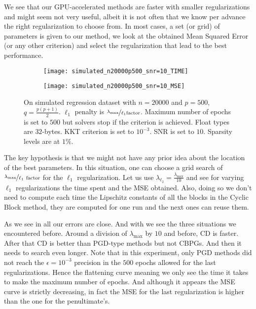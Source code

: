 \documentclass[../main.tex]{subfiles}
\begin{document}
\medskip

We see that our GPU-accelerated methods are faster with smaller regularizations
and might seem not very useful, albeit it is not often that we know per advance
the right regularization to choose from.
In most cases, a set (or grid) of parameters is given to our method, we look at
the obtained Mean Squared Error (or any other criterion) and select the
regularization that lead to the best performance.
\begin{figure}[h!]
	\begin{subfigure}{.47\textwidth}
		\centering
		\texttt{[image: simulated\_n20000p500\_snr=10\_TIME]}
		\label{fig:time_search}
	\end{subfigure} \hfill
	\begin{subfigure}{.47\textwidth}
		\centering
		\texttt{[image: simulated\_n20000p500\_snr=10\_MSE]}
		\label{fig:mse_search}
	\end{subfigure}
	\caption{On simulated regression dataset with $n=20000$ and $p=500$, $q=\frac{p(p+1)}{2}$.
	$\ell_1$ penalty is $\nicefrac{\lambda_{\max}}{\ell_1\text{factor}}$.
	Maximum number of epochs is set to $500$ but solvers stop if the criterion is achieved.
	Float types are $32$-bytes.
	KKT criterion is set to $10^{-3}$. SNR is set to $10$.
	Sparsity levels are at $1\%$.}
	\label{fig:path_simu}
\end{figure}
The key hypothesis is that we might not have any prior idea about the location
of the best parameters. In this situation, one can choose a grid search of
$\nicefrac{\lambda_{\max}}{\ell_1\ \text{factor}}$ for the $\ell_1$ regularization.
Let us use $\lambda_{\ell_2}=\frac{\lambda_{\max}}{10}$ and see for varying
$\ell_1$ regularizations the time spent and the MSE obtained.
Also, doing so we don't need to compute each time the Lipschitz constants of
all the blocks in the Cyclic Block method, they are computed for one run and
the next ones can reuse them.

\medskip

As we see in  all our errors are close.
And with  we see the three situations we encountered before.
Around a division of $\lambda_{\max}$ by $10$ and before, CD is faster.
After that CD is better than PGD-type methods but not CBPGs.
And then it needs to search even longer.
Note that in this experiment, only PGD methods did not reach the $\epsilon=10^{-3}$
precision in the $500$ epochs allowed for the last regularizations.
Hence the flattening curve meaning we only see the time it takes to make the
maximum number of epochs.
And although it appears the MSE curve is strictly decreasing,
in fact the MSE for the last regularization is higher than the one for
the penultimate's.
\end{document}
